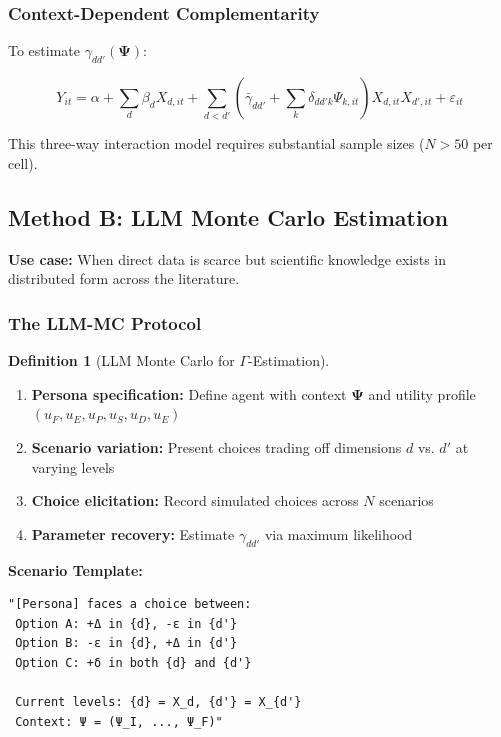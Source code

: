 \documentclass[11pt,a4paper]{article}
\theoremstyle{definition}
\newtheorem{definition}{Definition}[section]
\begin{document}
\subsubsection{Context-Dependent Complementarity}

To estimate $\gamma_{dd'}(\boldsymbol{\Psi})$:

\begin{equation}
Y_{it} = \alpha + \sum_d \beta_d X_{d,it} + \sum_{d < d'} \left( \bar{\gamma}_{dd'} + \sum_k \delta_{dd'k} \Psi_{k,it} \right) X_{d,it} X_{d',it} + \varepsilon_{it}
\end{equation}

This three-way interaction model requires substantial sample sizes 
($N > 50$ per cell).

\subsection{Method B: LLM Monte Carlo Estimation}

\textbf{Use case:} When direct data is scarce but scientific knowledge exists 
in distributed form across the literature.

\subsubsection{The LLM-MC Protocol}

\begin{definition}[LLM Monte Carlo for $\Gamma$-Estimation]
\begin{enumerate}
    \item \textbf{Persona specification:} Define agent with context $\boldsymbol{\Psi}$ 
    and utility profile $(u_F, u_E, u_P, u_S, u_D, u_E)$
    \item \textbf{Scenario variation:} Present choices trading off dimensions 
    $d$ vs. $d'$ at varying levels
    \item \textbf{Choice elicitation:} Record simulated choices across $N$ scenarios
    \item \textbf{Parameter recovery:} Estimate $\gamma_{dd'}$ via maximum likelihood
\end{enumerate}
\end{definition}

\textbf{Scenario Template:}
\begin{verbatim}
"[Persona] faces a choice between:
 Option A: +Δ in {d}, -ε in {d'}
 Option B: -ε in {d}, +Δ in {d'}
 Option C: +δ in both {d} and {d'}
 
 Current levels: {d} = X_d, {d'} = X_{d'}
 Context: Ψ = (Ψ_I, ..., Ψ_F)"
\end{verbatim}
\end{document}
